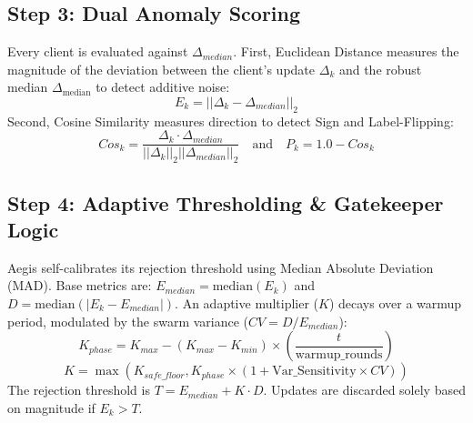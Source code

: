 \documentclass[10pt, conference]{IEEEtran}
\begin{document}
\subsection{Step 3: Dual Anomaly Scoring}
Every client is evaluated against $\Delta_{median}$. 
First, Euclidean Distance measures the magnitude of the deviation between the client’s update $\Delta_{k}$ and the robust median $\Delta_{\text{median}}$ to detect additive noise:
\begin{equation}
E_k = ||\Delta_k - \Delta_{median}||_2
\end{equation}
Second, Cosine Similarity measures direction to detect Sign and Label-Flipping:
\begin{equation}
Cos_k = \frac{\Delta_k \cdot \Delta_{median}}{||\Delta_k||_2 ||\Delta_{median}||_2} \quad \text{and} \quad P_k = 1.0 - Cos_k
\end{equation}

\subsection{Step 4: Adaptive Thresholding \& Gatekeeper Logic}
Aegis self-calibrates its rejection threshold using Median Absolute Deviation (MAD). Base metrics are: $E_{median} = \text{median}(E_k)$ and $D = \text{median}(|E_k - E_{median}|)$.
An adaptive multiplier ($K$) decays over a warmup period, modulated by the swarm variance ($CV = D / E_{median}$):
\begin{equation}
K_{phase} = K_{max} - (K_{max} - K_{min}) \times \left(\frac{t}{\text{warmup\_rounds}}\right)
\end{equation}
\begin{equation}
K = \max\left(K_{safe\_floor}, K_{phase} \times (1 + \text{Var\_Sensitivity} \times CV)\right)
\end{equation}
The rejection threshold is $T = E_{median} + K \cdot D$. Updates are discarded solely based on magnitude if $E_k > T$.
\end{document}
